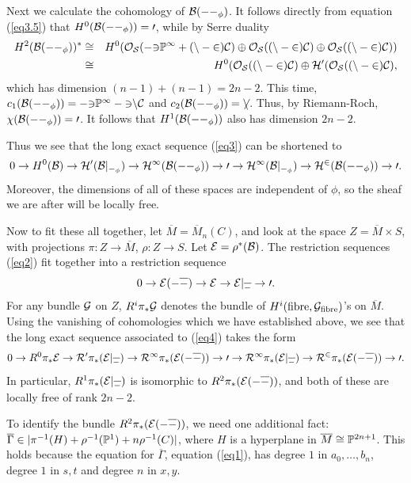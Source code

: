 Next we calculate the cohomology of $\B(-\Gamma_{\phi})$.
It follows directly from equation (\ref{eq3.5}) that
$H^0(\B(-\Gamma_{\phi}))=0$, while by Serre duality
\begin{eqnarray*}
H^2(\B(-\Gamma_\phi))^* & \cong &
H^0(\O_S(-3\P^1+(n-2)C)\oplus\O_S((n-2)C)\oplus\O_S((n-2)C)) \\
 & \cong &
H^0(\O_S((n-2)C)\oplus H^0(\O_S((n-2)C),
\end{eqnarray*}
which has dimension $(n-1)+(n-1)=2n-2$.
This time, $c_1(\B(-\Gamma_{\phi}))=-3\P^1-3nC$ and
$c_2(\B(-\Gamma_{\phi}))=6n$.  Thus, by
Riemann-Roch, $\chi(\B(-\Gamma_{\phi}))=0$.  It
follows that $H^1(\B(-\Gamma_{\phi}))$ also has dimension $2n-2$.

Thus we see that the long exact sequence (\ref{eq3}) can be
shortened to
\begin{equation}
 0  \to  H^0(\B)  \to  H^0(\B|_{\Gamma_{\phi}})
   \to  H^1(\B(-\Gamma_{\phi}))  \to  0  \to
    H^1(\B|_{\Gamma_{\phi}})
  \to  H^2(\B(-\Gamma_{\phi}))  \to  0.
\end{equation}
Moreover, the dimensions of all of these spaces are independent of
$\phi$, so the sheaf we are after will be locally free.

Now to fit these all together, let $\overline M=\overline M_n(C)$, and
look at the space $Z=\overline M\times S$,
with projections $\pi:Z\to\overline M$, $\rho:Z\to S$.  Let
$\E=\rho^*(\B)$.
The restriction sequences (\ref{eq2}) fit together into a restriction sequence
\begin{equation} \label{eq4}
0\to\E(-\overline\Gamma)\to\E\to\E|_{\overline\Gamma}\to0.
\end{equation}
For any bundle ${\cal G}$ on $Z$, $R^i\pi_*\cal G$ denotes the bundle
of $H^i(\text{fibre},\cal G_{\text{fibre}})$'s on $\overline M$.
Using the vanishing of cohomologies which we have established above,
we see that
the long exact sequence associated to (\ref{eq4}) takes the form
\begin{equation}
0\to R^0\pi_*\E\to R^0\pi_*(\E|_{\overline\Gamma})\to
R^1\pi_*(\E(-\overline\Gamma))\to0\to R^1\pi_*(\E|_{\overline\Gamma})\to
R^2\pi_*(\E(-\overline\Gamma))\to0.
\end{equation}
In particular, $R^1\pi_*(\E|_{\overline\Gamma})$
is isomorphic to $R^2\pi_*(\E(-\overline\Gamma))$, and
both of these are locally free of rank $2n-2$.

To identify the bundle $R^2\pi_*(\E(-\overline\Gamma))$, we need
one additional fact:
$\overline\Gamma\in|\pi^{-1}(H)+\rho^{-1}(\P^1)+n\rho^{-1}(C)|$,
where $H$ is a hyperplane in $\overline M\cong\P^{2n+1}$.  This holds because
the equation for $\overline\Gamma$, equation (\ref{eq1}), has degree $1$
in $a_0,\dots,b_n$, degree $1$ in $s,t$ and degree $n$ in $x,y$.

